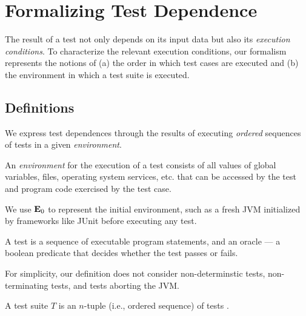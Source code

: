 
\section{Formalizing Test Dependence}
\label{sec:formalism}


The result of a test not only depends on
its input data but also its \emph{execution conditions}.
To characterize the relevant execution conditions, 
our formalism represents the notions of
(a) the order in which test cases are executed and (b) the environment in which a test suite is executed.  


\subsection{Definitions}
\label{sec:definitions}

We express test dependences through the results of executing
\emph{ordered} sequences of tests in a given \emph{environment}.


\begin{definition}[Environment]
An \emph{environment} \env for the execution of a test
consists of all values of global variables, files,
operating
system services, etc. that
can be accessed by the test and program code exercised by the test
case.
\end{definition}

We use $\mathbf{E}_0$ to represent the initial environment, such
as a fresh JVM initialized by frameworks like JUnit
before executing any test.


\begin{definition}[Test]

A test is a sequence of executable program statements, and an oracle
--- a boolean predicate that
decides whether the test passes or fails.
\end{definition}

For simplicity, our definition does not consider non-determinstic
tests, non-terminating tests, and tests aborting the JVM.


\begin{definition}
A test suite\/ $T$ is an $n$-tuple (i.e., ordered sequence) of tests
.

\end{definition}



